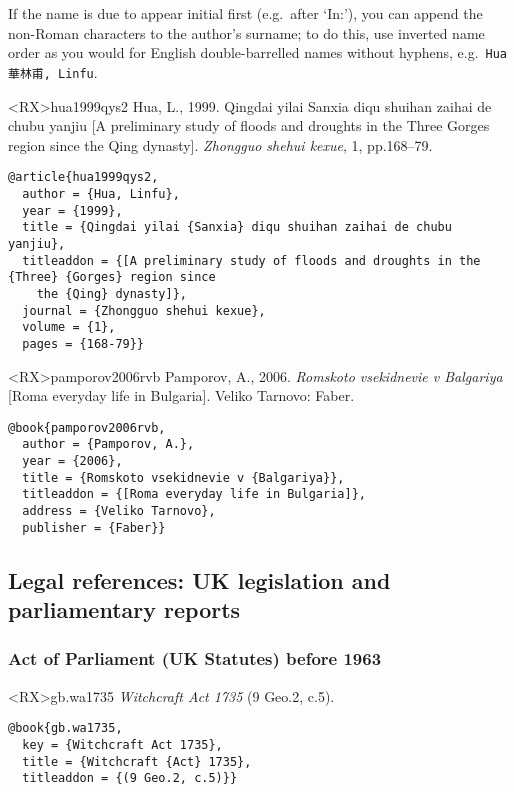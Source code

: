 \documentclass[10pt,a4paper]{article}
\newenvironment{tips}{%
  \begin{list}{\makebox[2em][c]{\faLightbulbO}}{%
    \setlength{\leftmargin}{2em}
    \setlength{\labelwidth}{2em}
    \setlength{\labelsep}{0pt}}
}{\end{list}}
\begin{document}
\begin{tips}
\item If the name is due to appear initial first (e.g.\ after `In:'), you can append the non-Roman characters to the author's surname; to do this, use inverted name order as you would for English double-barrelled names without hyphens, e.g.\ \texttt{Hua 華林甫, Linfu}.
\end{tips}

\begin{bibexbox}<RX>{hua1999qys2}
  Hua, L., 1999. Qingdai yilai Sanxia diqu shuihan zaihai de chubu yanjiu [A preliminary study of floods and droughts in the Three Gorges region since the Qing dynasty]. \emph{Zhongguo shehui kexue}, 1, pp.168--79.
  \tcblower
\begin{Verbatim}
@article{hua1999qys2,
  author = {Hua, Linfu},
  year = {1999},
  title = {Qingdai yilai {Sanxia} diqu shuihan zaihai de chubu yanjiu},
  titleaddon = {[A preliminary study of floods and droughts in the {Three} {Gorges} region since
    the {Qing} dynasty]},
  journal = {Zhongguo shehui kexue},
  volume = {1},
  pages = {168-79}}
\end{Verbatim}
\end{bibexbox}

\begin{bibexbox}<RX>{pamporov2006rvb}
  Pamporov, A., 2006. \emph{Romskoto vsekidnevie v Balgariya} [Roma everyday life in Bulgaria]. Veliko Tarnovo: Faber.
  \tcblower
\begin{Verbatim}
@book{pamporov2006rvb,
  author = {Pamporov, A.},
  year = {2006},
  title = {Romskoto vsekidnevie v {Balgariya}},
  titleaddon = {[Roma everyday life in Bulgaria]},
  address = {Veliko Tarnovo},
  publisher = {Faber}}
\end{Verbatim}
\end{bibexbox}

\subsection{Legal references: UK legislation and parliamentary reports}


\subsubsection*{Act of Parliament (UK Statutes) before 1963}

\begin{bibexbox}<RX>{gb.wa1735}
  \emph{Witchcraft Act 1735} (9 Geo.2, c.5).
  \tcblower
\begin{Verbatim}
@book{gb.wa1735,
  key = {Witchcraft Act 1735},
  title = {Witchcraft {Act} 1735},
  titleaddon = {(9 Geo.2, c.5)}}
\end{Verbatim}
\end{bibexbox}
\end{document}
